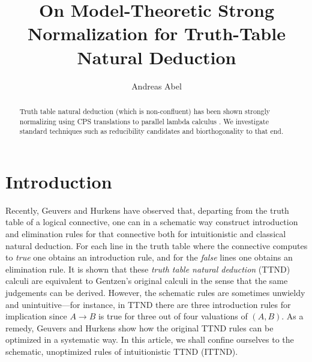 \documentclass[a4paper,USenglish,cleveref, autoref, thm-restate]{lipics-v2019}
\title{On Model-Theoretic Strong Normalization for Truth-Table Natural Deduction}
\author{Andreas Abel
  }{Department of Computer Science,
    Gothenburg University,
    Sweden
  }{andreas.abel@gu.se
  }{https://orcid.org/0000-0003-0420-4492
  }{(Optional) author-specific funding acknowledgements}
\begin{document}
\maketitle

\begin{abstract}
Truth table natural deduction
\cite{geuversHurkens:icla17,geuversHurkens:types17}
(which is non-confluent) has been shown
strongly normalizing using CPS translations to parallel lambda
calculus \cite{geuversGiessenHurkens:fundinf19}.  We investigate
standard techniques such as reducibility candidates and
biorthogonality to that end.
\end{abstract}

\section{Introduction}
\label{sec:intro}

%
%
%
%


%
%
%
%
%

Recently, Geuvers and Hurkens \cite{geuversHurkens:icla17} have
observed that, departing from the truth table of a logical connective,
one can in a schematic way construct introduction and elimination
rules for that connective both for intuitionistic and classical
natural deduction.  For each line in the truth table where the
connective computes to \emph{true} one obtains an introduction rule,
and for the \emph{false} lines one obtains an elimination rule.
It is shown that these \emph{truth table natural deduction} (TTND)
calculi are equivalent to Gentzen's original calculi
\cite{gentzen:natuerlichesSchliessen}
in the sense that the
same judgements can be derived.  However, the schematic rules are
sometimes unwieldy and unintuitive---for instance, in TTND there are three
introduction rules for implication since $A \to B$ is true for three
out of four valuations of $(A,B)$.  As a remedy, Geuvers and Hurkens
show how the original TTND rules can be optimized in a systematic
way.  In this article, we shall confine ourselves to the schematic,
unoptimized rules of intuitionistic TTND (ITTND).
\end{document}
